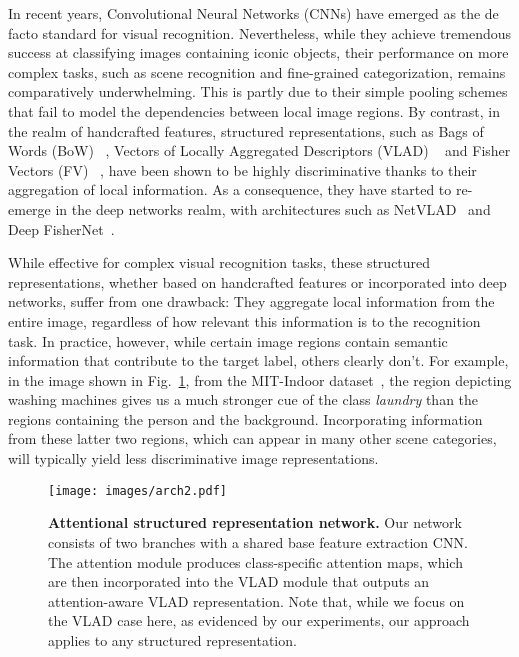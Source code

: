 \documentclass{bmvc2k}
\begin{document}
In recent years, Convolutional Neural Networks (CNNs) have emerged as the de facto standard for visual recognition. Nevertheless, while they achieve tremendous success at classifying images containing iconic objects, their performance on more complex tasks, such as scene recognition and fine-grained categorization, remains comparatively underwhelming. This is partly due to their simple pooling schemes that fail to model the dependencies between local image regions. By contrast, in the realm of handcrafted features, structured representations, such as Bags of Words (BoW) ~\cite{bow3,BoW1,BoW2}, Vectors of Locally Aggregated Descriptors (VLAD)  ~\cite{vlad,allaboutvlad}  and Fisher Vectors (FV) ~\cite{fisher2010,fisher2013}, have been shown to be highly discriminative thanks to their aggregation of local information. As a consequence, they have started to re-emerge in the deep networks realm, with architectures such as NetVLAD~\cite{netvlad} and Deep FisherNet~\cite{deepfishernet}.

While effective for complex visual recognition tasks, these structured representations, whether based on handcrafted features or incorporated into deep networks, suffer from one drawback: They aggregate local information from the entire image, regardless of how relevant this information is to the recognition task. In practice, however, while certain image regions contain semantic information that contribute to the target label, others clearly don't. For example, in the image shown in Fig.~\ref{fig:arch}, from the MIT-Indoor dataset~\cite{mitindoor2009}, the region depicting washing machines gives us a much stronger cue of the class \emph{laundry} than the regions containing  the person and the background. Incorporating information from these latter two regions, which can appear in many other scene categories, will typically yield less discriminative image representations.

\begin{figure}
	\centering
	\texttt{[image: images/arch2.pdf]}
	\vspace{0.12in}
	
	\caption{\label{fig:arch} \textbf{Attentional structured representation network.} Our network consists of two branches with a shared base feature extraction CNN. The attention module produces class-specific attention maps, which are then incorporated into the VLAD module that outputs an attention-aware VLAD representation. Note that, while we focus on the VLAD case here, as evidenced by our experiments, our approach applies to any structured representation.}
	\vspace{-0.2in}
\end{figure}
\end{document}
